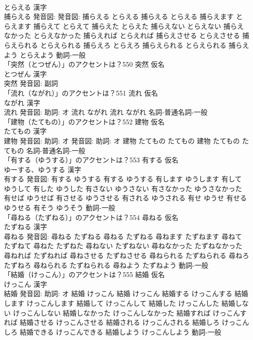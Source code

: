 \documentclass[8pt]{extreport}
\begin{document}
\begin{CJK}{UTF8}{min}
\\	とらえる 漢字　
\\	捕らえる 発音図: 発音図:	捕らえる とらえる		捕らえる とらえる 捕らえます とらえます 捕らえて とらえて 捕らえた とらえた 捕らえない とらえない 捕らえなかった とらえなかった 捕らえれば とらえれば 捕らえさせる とらえさせる 捕らえられる とらえられる 捕らえろ とらえろ 捕らえられる とらえられる 捕らえよう とらえよう				動詞-一般 
\\	「突然（とつぜん）」のアクセントは？550	突然 仮名　
\\	とつぜん 漢字　
\\	突然 発音図:							副詞 
\\	「流れ（ながれ）」のアクセントは？551	流れ 仮名　
\\	ながれ 漢字　
\\	流れ 発音図: 助詞: オ	流れ ながれ		流れ ながれ				名詞-普通名詞-一般 
\\	「建物（たてもの）」のアクセントは？552	建物 仮名　
\\	たてもの 漢字　
\\	建物 発音図: 助詞: オ 発音図: 助詞: オ	建物 たてもの たてもの		建物 たてもの たてもの				名詞-普通名詞-一般 
\\	「有する（ゆうする）」のアクセントは？553	有する 仮名　
\\	ゆーする、ゆうする 漢字　
\\	有する 発音図:	有する ゆうする		有する ゆうする 有します ゆうします 有して ゆうして 有した ゆうした 有さない ゆうさない 有さなかった ゆうさなかった 有せば ゆうせば 有させる ゆうさせる 有される ゆうされる 有せ ゆうせ 有せる ゆうせる 有そう ゆうそう				動詞-一般 
\\	「尋ねる（たずねる）」のアクセントは？554	尋ねる 仮名　
\\	たずねる 漢字　
\\	尋ねる 発音図:	尋ねる たずねる		尋ねる たずねる 尋ねます たずねます 尋ねて たずねて 尋ねた たずねた 尋ねない たずねない 尋ねなかった たずねなかった 尋ねれば たずねれば 尋ねさせる たずねさせる 尋ねられる たずねられる 尋ねろ たずねろ 尋ねられる たずねられる 尋ねよう たずねよう				動詞-一般 
\\	「結婚（けっこん）」のアクセントは？555	結婚 仮名　
\\	けっこん 漢字　
\\	結婚 発音図: 助詞: オ	結婚 けっこん		結婚 けっこん 結婚する けっこんする 結婚します けっこんします 結婚して けっこんして 結婚した けっこんした 結婚しない けっこんしない 結婚しなかった けっこんしなかった 結婚すれば けっこんすれば 結婚させる けっこんさせる 結婚される けっこんされる 結婚しろ けっこんしろ 結婚できる けっこんできる 結婚しよう けっこんしよう				動詞-一般 

\end{CJK}
\end{document}
